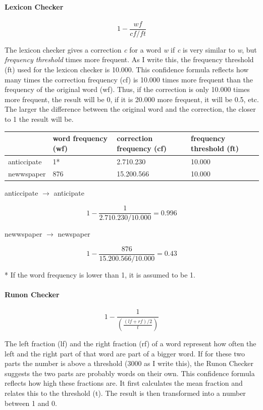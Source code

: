\documentclass[12pt]{article}
\begin{document}
\paragraph{Lexicon Checker}

\[
1 - \frac{wf}{cf/ft}
\]

The lexicon checker gives a correction \emph{c} for a word \emph{w} if \emph{c} is very similar to \emph{w}, but \emph{frequency threshold} times more frequent. As I write this, the frequency threshold (ft) used for the lexicon checker is 10.000. This confidence formula reflects how many times the correction frequency (cf) is 10.000 times more frequent than the frequency of the original word (wf). Thus, if the correction is only 10.000 times more frequent, the result will be 0, if it is 20.000 more frequent, it will be 0.5, etc. The larger the difference between the original word and the correction, the closer to 1 the result will be.

\begin{table}[h]
\begin{tabular}{|l|lll|}
\hline
&word frequency (wf)&correction frequency (cf)&frequency threshold (ft)\\ 
\hline
anticcipate&1*&2.710.230&10.000\\
newwspaper&876&15.200.566&10.000\\
\hline
\end{tabular}
\end{table}

anticcipate $\rightarrow$ anticipate

\[
1 - \frac{1}{2.710.230/10.000} = 0.996
\]

newwspaper $\rightarrow$ newspaper

\[
1 - \frac{876}{15.200.566/10.000} = 0.43
\]

* If the word frequency is lower than 1, it is assumed to be 1.

\paragraph{Runon Checker}

\[
1 - \frac{1}{(\frac{(lf+rf)/2}{t})}
\]

The left fraction (lf) and the right fraction (rf) of a word represent how often the left and the right part of that word are part of a bigger word. If for these two parts the number is above a threshold (3000 as I write this), the Runon Checker suggests the two parts are probably words on their own. This confidence formula reflects how high these fractions are. It first calculates the mean fraction and relates this to the threshold (t). The result is then transformed into a number between 1 and 0.
\end{document}
